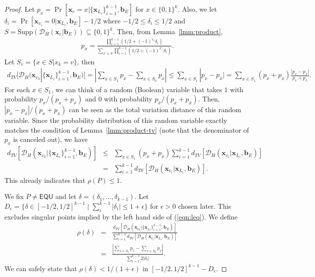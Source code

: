 \documentclass[letterpaper,11pt]{article}
\newcommand{\dtv}{d_{TV}}
\newcommand{\cald}{\mathcal{D}}
\newcommand{\bfx}{\mathbf{x}}
\newcommand{\bfb}{\mathbf{b}}
\newcommand{\bit}{\{0,1\}}
\newcommand{\supp}{\mathrm{Supp}}
\newcommand{\equ}{\textsf{EQU}\xspace}
\begin{document}
\begin{proof}
  Let $p_x=\Pr[\bfx_e=x|\{\bfx_{L_i}\}_{i=1}^{k-1},\bfb_E]$ for $x\in \bit^{k}$.
  Also, we let \(\delta_i=\Pr[\bfx_{v_i}=0|\bfx_{L_i},\bfb_E]-1/2\) where $-1/2\leq \delta_i \leq 1/2$ and \(S=\supp(\cald_H(\bfx_e|\bfb_E))\subseteq \bit^k \).
  Then, from Lemma~\ref{lmm:product}, 
  \begin{eqnarray*}
    p_x=\frac{\prod_{i=1}^{k-1}(1/2+(-1)^{x_i}\delta_i)}{\sum_{x'\in S}\prod_{i=1}^{k-1}(1/2+(-1)^{x'_i}\delta_i)}.
  \end{eqnarray*}
  Let \(S_v=\{x \in S | x_k=v \}\), then 
  \begin{eqnarray*}
    \dtv[\cald_H(\bfx_{v_k}|\{\bfx_{L_i}\}_{i=1}^{k-1},\bfb_E)]
    =
    \left| \sum_{x\in S_1}p_x-\sum_{x\in S_0}p_x \right| 
    \leq 
    \sum_{x\in S_1} |p_x-p_{\overline{x}}|
    =
    \sum_{x\in S_1} (p_x+p_{\overline{x}})\frac{|p_x-p_{\overline{x}}|}{p_x+p_{\overline{x}}}.
  \end{eqnarray*}
  For each $x\in S_1$, 
  we can think of a random (Boolean) variable that takes $1$ with probability $p_x/(p_x+p_{\overline{x}})$ and $0$ with probability $p_{\overline{x}}/(p_x+p_{\overline{x}})$.
  Then, $|p_x-p_{\overline{x}}|/(p_x+p_{\overline{x}})$ can be seen as the total variation distance of this random variable.
  Since the probability distribution of this random variable exactly matches the condition of Lemma~\ref{lmm:product-tv} (note that the denominator of $p_x$ is canceled out), 
  we have
  \begin{eqnarray}
    \dtv[\cald_H(\bfx_{v_k}|\{\bfx_{L_i}\}_{i=1}^{k-1},\bfb_E)]
    &\leq &
    \sum_{x\in S_1} (p_x+p_{\overline{x}}) \sum_{i=1}^{k-1}\dtv[\cald_H(\bfx_{v_i}|\bfx_{L_i},\bfb_E)] \label{eqn:leq2} \\
    &=&
    \sum_{i=1}^{k-1}\dtv[\cald_H(\bfx_{v_i}|\bfx_{L_i},\bfb_E)]. \nonumber
  \end{eqnarray}
  This already indicates that $\rho(P)\leq 1$.

  We fix $P\neq \equ$ and let $\delta=(\delta_1,\ldots,\delta_{k-1})$.
  Let $D_\epsilon=\{\delta\in[-1/2,1/2]^{k-1}\mid \sum_{i}^{k-1}|\delta_i| \leq 1+\epsilon  \}$ for $\epsilon>0$ chosen later.
  This excludes singular points implied by the left hand side of (\ref{eqn:leq}).
  We define
  \begin{eqnarray*}
    \rho(\delta)
    &=&
    \frac{\dtv[\cald_H(\bfx_{v_k}|\{\bfx_{L_i}\}_{i=1}^{k-1},\bfb_E)]}{\sum_{i=1}^{k-1}\dtv[\cald_H(\bfx_{v_i}|\bfx_{L_i},\bfb_E)]}\\
    &=&
    \frac{\left| \sum_{x\in S_1}p_x-\sum_{x\in S_0}p_x \right|}{\sum_{i=1}^{k-1}2|\delta_i|}.
  \end{eqnarray*}
  We can safely state that $\rho(\delta)<1/(1+\epsilon)$ in $[-1/2,1/2]^{k-1}-D_\epsilon$.


\end{proof}
\end{document}
